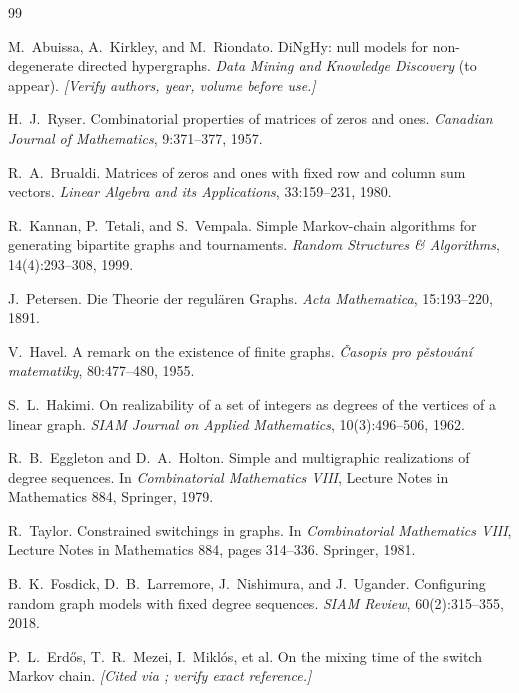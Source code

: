 \documentclass[11pt]{article}
\theoremstyle{definition}
\begin{document}
\begin{thebibliography}{99}

M.~Abuissa, A.~Kirkley, and M.~Riondato.
\newblock DiNgHy: null models for non-degenerate directed hypergraphs.
\newblock \emph{Data Mining and Knowledge Discovery} (to appear).
\newblock \emph{[Verify authors, year, volume before use.]}

H.~J.~Ryser.
\newblock Combinatorial properties of matrices of zeros and ones.
\newblock \emph{Canadian Journal of Mathematics}, 9:371--377, 1957.

R.~A.~Brualdi.
\newblock Matrices of zeros and ones with fixed row and column sum vectors.
\newblock \emph{Linear Algebra and its Applications}, 33:159--231, 1980.

R.~Kannan, P.~Tetali, and S.~Vempala.
\newblock Simple Markov-chain algorithms for generating bipartite graphs and
  tournaments.
\newblock \emph{Random Structures \& Algorithms}, 14(4):293--308, 1999.

J.~Petersen.
\newblock Die Theorie der regul\"aren Graphs.
\newblock \emph{Acta Mathematica}, 15:193--220, 1891.

V.~Havel.
\newblock A remark on the existence of finite graphs.
\newblock \emph{\v{C}asopis pro p\v{e}stov\'an\'i matematiky}, 80:477--480, 1955.

S.~L.~Hakimi.
\newblock On realizability of a set of integers as degrees of the vertices of a
  linear graph.
\newblock \emph{SIAM Journal on Applied Mathematics}, 10(3):496--506, 1962.

R.~B.~Eggleton and D.~A.~Holton.
\newblock Simple and multigraphic realizations of degree sequences.
\newblock In \emph{Combinatorial Mathematics VIII}, Lecture Notes in
  Mathematics 884, Springer, 1979.

R.~Taylor.
\newblock Constrained switchings in graphs.
\newblock In \emph{Combinatorial Mathematics VIII}, Lecture Notes in
  Mathematics 884, pages 314--336. Springer, 1981.

B.~K.~Fosdick, D.~B.~Larremore, J.~Nishimura, and J.~Ugander.
\newblock Configuring random graph models with fixed degree sequences.
\newblock \emph{SIAM Review}, 60(2):315--355, 2018.

P.~L.~Erd\H{o}s, T.~R.~Mezei, I.~Mikl\'os, et al.
\newblock On the mixing time of the switch Markov chain.
\newblock \emph{[Cited via \cite{dinghy}; verify exact reference.]}

\end{thebibliography}
\end{document}
